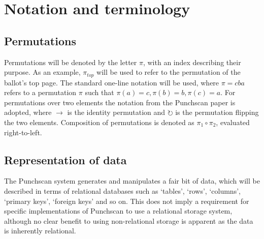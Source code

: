 \section{Notation and terminology}

\subsection{Permutations}

Permutations will be denoted by the letter $\pi$, with an index describing
their purpose. As an example, $\pi_{top}$ will be used to refer to the
permutation of the ballot's top page. The standard one-line notation will be
used, where $\pi = cba$ refers to a permutation $\pi$ such that $\pi(a) = c,
\pi(b) = b, \pi(c) = a$. For permutations over two elements the notation from
the Punchscan paper is adopted, where $\rightarrow$ is the identity permutation
and $\circlearrowright$ is the permutation flipping the two elements.
Composition of permutations is denoted as $\pi_1 \circ \pi_2$, evaluated
right-to-left.

\subsection{Representation of data}

The Punchscan system generates and manipulates a fair bit of data, which will
be described in terms of relational databases such as `tables', `rows',
`columns', `primary keys', `foreign keys' and so on. This does not imply a
requirement for specific implementations of Punchscan to use a relational
storage system, although no clear benefit to using non-relational storage is
apparent as the data is inherently relational.
